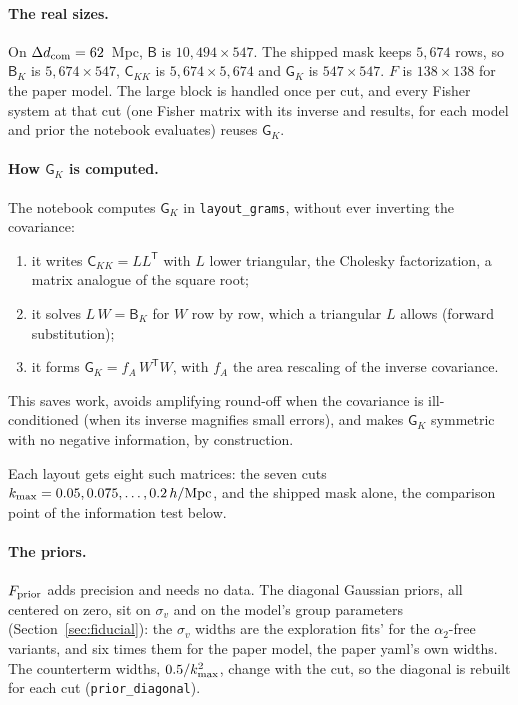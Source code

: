 \documentclass[11pt]{article}
\newcommand{\Cov}{\mathsf{C}}
\newcommand{\T}{^{\mathsf{T}}}
\newcommand{\kmax}{k_{\rm max}}
\newcommand{\hMpc}{\,h/{\rm Mpc}}
\newcommand{\mB}{\mathsf{B}}
\newcommand{\mG}{\mathsf{G}}
\newcommand{\us}{\_\allowbreak}
\begin{document}
\paragraph{The real sizes.}
On $\Delta d_{\rm com} = 62$~Mpc, $\mB$ is $10{,}494 \times 547$.  The
shipped mask keeps $5{,}674$ rows, so $\mB_K$ is $5{,}674 \times 547$,
$\Cov_{KK}$ is $5{,}674 \times 5{,}674$ and $\mG_K$ is $547 \times 547$.
$F$ is $138 \times 138$ for the paper model.  The large block is
handled once per cut, and every Fisher system at that cut (one Fisher
matrix with its inverse and results, for each model and prior the
notebook evaluates) reuses $\mG_K$.

\paragraph{How $\mG_K$ is computed.}
The notebook computes $\mG_K$ in \texttt{layout\us grams}, without ever
inverting the covariance:
\begin{enumerate}
  \item it writes $\Cov_{KK} = L L\T$ with $L$ lower triangular, the
    Cholesky factorization, a matrix analogue of the square root;
  \item it solves $L\,W = \mB_K$ for $W$ row by row, which a
    triangular $L$ allows (forward substitution);
  \item it forms $\mG_K = f_A\, W\T W$, with $f_A$ the area
    rescaling of the inverse covariance.
\end{enumerate}
This saves work, avoids amplifying round-off when the covariance is
ill-conditioned (when its inverse magnifies small errors), and makes
$\mG_K$ symmetric with no negative information, by construction.

Each layout gets eight such matrices: the seven cuts
$\kmax = 0.05, 0.075, \ldots, 0.2\hMpc$, and the shipped mask alone,
the comparison point of the information test below.

\paragraph{The priors.}
$F_{\rm prior}$ adds precision and needs no data.  The diagonal Gaussian
priors, all centered on zero, sit on $\sigma_v$ and on the model's
group parameters (Section~\ref{sec:fiducial}): the $\sigma_v$ widths
are the exploration fits' for the $\alpha_2$-free variants, and six
times them for the paper model, the paper yaml's own widths.  The
counterterm widths,
$0.5/\kmax^2$, change with the cut, so the diagonal is rebuilt for each
cut (\texttt{prior\us diagonal}).
\end{document}
